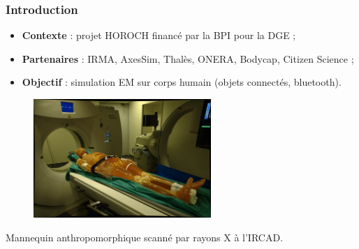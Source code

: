 \begin{frame}
\frametitle{Introduction}
\vfill
\begin{itemize}
\item \textbf{Contexte} : projet HOROCH financé par la BPI pour la DGE ;
\item \textbf{Partenaires} : IRMA, AxesSim, Thalès, ONERA, Bodycap, Citizen Science ;
\item \textbf{Objectif} : simulation EM sur corps humain (objets connectés, bluetooth).
\end{itemize}
\vfill
\begin{figure}
\includegraphics[width=0.6\textwidth]{../img/kyoto_irm}
\end{figure}
\vfill
Mannequin anthropomorphique scanné par rayons X à l'IRCAD.
\vfill
\end{frame}

